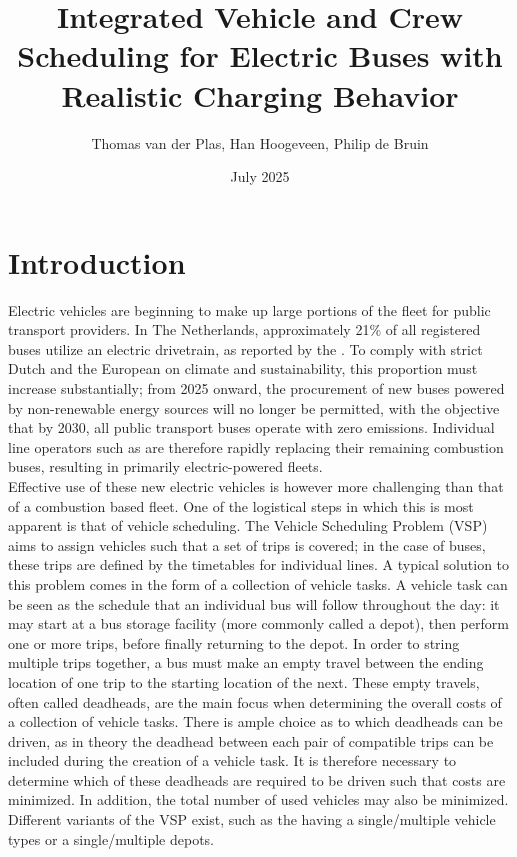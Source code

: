 \documentclass[]{article}
\title{Integrated Vehicle and Crew Scheduling for Electric Buses with Realistic Charging Behavior}
\date{July 2025}
\author{Thomas van der Plas, Han Hoogeveen, Philip de Bruin}
\begin{document}
\maketitle

\section{Introduction}
Electric vehicles are beginning to make up large portions of the fleet for public transport providers. In The Netherlands, approximately 21\% of all registered buses utilize an electric drivetrain, as reported by the \citet{RDW}. To comply with strict Dutch and the European \citet{europaRegulation20181999} on climate and sustainability, this proportion must increase substantially; from 2025 onward, the procurement of new buses powered by non-renewable energy sources will no longer be permitted, with the objective that by 2030, all public transport buses operate with zero emissions. Individual line operators such as \citet{qbuzzQbuzz} are therefore rapidly replacing their remaining combustion buses, resulting in primarily electric-powered fleets. \\
Effective use of these new electric vehicles is however more challenging than that of a combustion based fleet. One of the logistical steps in which this is most apparent is that of vehicle scheduling. The Vehicle Scheduling Problem (VSP) aims to assign vehicles such that a set of trips is covered; in the case of buses, these trips are defined by the timetables for individual lines. A typical solution to this problem comes in the form of a collection of vehicle tasks. A vehicle task can be seen as the schedule that an individual bus will follow throughout the day: it may start at a bus storage facility (more commonly called a depot), then perform one or more trips, before finally returning to the depot. In order to string multiple trips together, a bus must make an empty travel between the ending location of one trip to the starting location of the next. These empty travels, often called deadheads, are the main focus when determining the overall costs of a collection of vehicle tasks. There is ample choice as to which deadheads can be driven, as in theory the deadhead between each pair of compatible trips can be included during the creation of a vehicle task. It is therefore necessary to determine which of these deadheads are required to be driven such that costs are minimized. In addition, the total number of used vehicles may also be minimized. Different variants of the VSP exist, such as the having a single/multiple vehicle types or a single/multiple depots. \\
\end{document}
